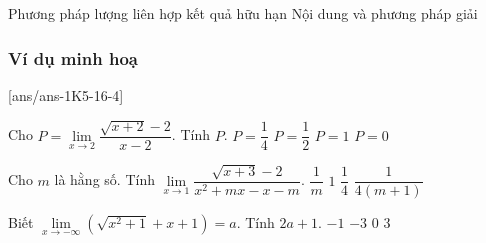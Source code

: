 \begin{dang}{Phương pháp lượng liên hợp kết quả hữu hạn}
	Nội dung và phương pháp giải
\end{dang}
\subsubsection{Ví dụ minh hoạ}
[ans/ans-1K5-16-4]
\setcounter{vd}{0}
	\begin{vd}%
	Cho $P = \lim \limits_{x \to 2} \dfrac{\sqrt{x+2}-2}{x-2}$. Tính $P$.
	\choice
	{\True $P = \dfrac{1}{4}$}
	{$P = \dfrac{1}{2}$}
	{$P = 1$}
	{$P = 0$}
\end{vd}
\begin{vd}%
	Cho $m$ là hằng số. Tính $\lim\limits_{x\to 1}\dfrac{\sqrt{x+3}-2}{x^2+mx-x-m}$.
	\choice
	{$\dfrac{1}{m}$}
	{$1$}
	{$\dfrac{1}{4}$}
	{\True $\dfrac{1}{4(m+1)}$}
\end{vd}
\begin{vd}%
	Biết $\lim\limits_{x\to -\infty}\left(\sqrt{x^2+1}+x+1\right)=a$. Tính $2a+1.$
	\choice
	{$-1$}
	{$-3$}
	{$0$}
	{\True $3$}
\end{vd}


